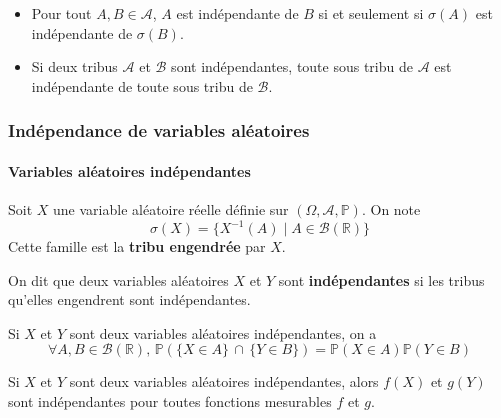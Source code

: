   \begin{remark}
    \begin{itemize}
      \item Pour tout $A, B \in \mathcal{A}$, $A$ est indépendante de $B$ si et seulement si $\sigma(A)$ est indépendante de $\sigma(B)$.
      \item Si deux tribus $\mathcal{A}$ et $\mathcal{B}$ sont indépendantes, toute sous tribu de $\mathcal{A}$ est indépendante de toute sous tribu de $\mathcal{B}$.
    \end{itemize}
  \end{remark}

  \subsubsection{Indépendance de variables aléatoires}

  \paragraph{Variables aléatoires indépendantes}


  \begin{definition}
    Soit $X$ une variable aléatoire réelle définie sur $(\Omega, \mathcal{A}, \mathbb{P})$. On note
    \[ \sigma(X) = \{ X^{-1}(A) \mid A \in \mathcal{B}(\mathbb{R}) \} \]
    Cette famille est la \textbf{tribu engendrée} par $X$.
  \end{definition}

  \begin{definition}
    On dit que deux variables aléatoires $X$ et $Y$ sont \textbf{indépendantes} si les tribus qu'elles engendrent sont indépendantes.
  \end{definition}

  \begin{example}
    Si $X$ et $Y$ sont deux variables aléatoires indépendantes, on a
    \[ \forall A, B \in \mathcal{B}(\mathbb{R}), \, \mathbb{P}(\{ X \in A \} \, \cap \, \{ Y \in B \}) = \mathbb{P}(X \in A) \mathbb{P}(Y \in B) \]
  \end{example}

  \begin{proposition}
    Si $X$ et $Y$ sont deux variables aléatoires indépendantes, alors $f(X)$ et $g(Y)$ sont indépendantes pour toutes fonctions mesurables $f$ et $g$.
  \end{proposition}


